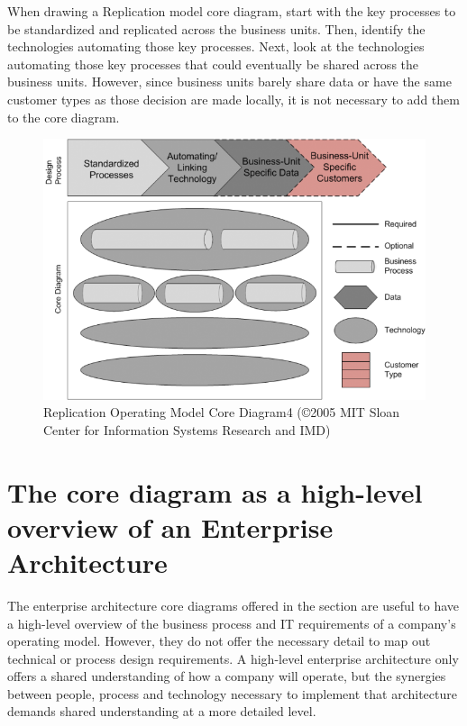 When drawing a Replication model core diagram, start with the key processes to be standardized and replicated
across the business units.
Then, identify the technologies automating those key processes.
Next, look at the technologies automating those key processes that could eventually be shared across the business units.
However, since business units barely share data or have the same customer types as those decision are made locally,
it is not necessary to add them to the core diagram.

\begin{figure}[ht]
    \centering
    \includegraphics[width=\textwidth]{../images/replication-operating-model-core-diagram4.png}
    \caption{Replication Operating Model Core Diagram4 (©2005 MIT Sloan Center for Information Systems Research and IMD)}
    \label{fig:ekgmm-ea-replication-operating-model-core-diagram4}
\end{figure}

\section*{The core diagram as a high-level overview of an Enterprise Architecture}

The enterprise architecture core diagrams offered in the section are useful to have a high-level overview of the
business process and IT requirements of a company’s operating model.
However, they do not offer the necessary detail to map out technical or process design requirements.
A high-level enterprise architecture only offers a shared understanding of how a company will operate,
but the synergies between people, process and technology necessary to implement that architecture demands
shared understanding at a more detailed level.

